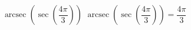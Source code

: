  {$\operatorname{arcsec}\left(\sec\left(\dfrac{4\pi}{3}\right) \right)$}
{ $\operatorname{arcsec}\left(\sec\left(\dfrac{4\pi}{3}\right) \right) = \dfrac{4\pi}{3}$}
